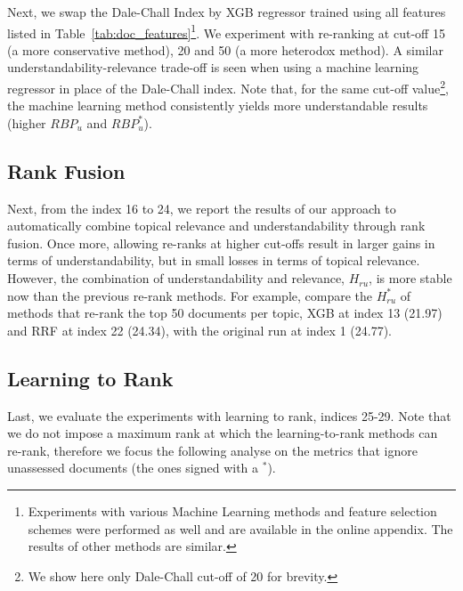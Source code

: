 Next, we swap the Dale-Chall Index by XGB regressor trained using all features listed in Table~\ref{tab:doc_features}\footnote{Experiments with various Machine Learning methods and feature selection schemes were performed as well and are available in the online appendix. The results of other methods are similar.}. %
We experiment with re-ranking at cut-off 15 (a more conservative method), 20 and 50 (a more heterodox method). 
A similar understandability-relevance trade-off is seen when using a machine learning regressor in place of the Dale-Chall index.
Note that, for the same cut-off value\footnote{We show here only Dale-Chall cut-off of 20 for brevity.}, the machine learning method consistently yields more understandable results (higher $RBP_u$ and $RBP_u^*$). 

\subsection{Rank Fusion}
\label{results:fusion}

Next, from the index 16 to 24, we report the results of our approach to automatically combine topical relevance and understandability through rank fusion.
Once more, allowing re-ranks at higher cut-offs result in larger gains in terms of understandability, but in small losses in terms of topical relevance.
However, the combination of understandability and relevance, $H_{ru}$, is more stable now than the previous re-rank methods. 
For example, compare the $H_{ru}^*$ of methods that re-rank the top 50 documents per topic, XGB at index 13 (21.97) and RRF at index 22 (24.34), with the original run at index 1 (24.77).

\subsection{Learning to Rank}
\label{results:ltr}

Last, we evaluate the experiments with learning to rank, indices 25-29. Note that we do not impose a maximum rank at which the learning-to-rank methods can re-rank, therefore we focus the following analyse on the metrics that ignore unassessed documents (the ones signed with a $^*$).

